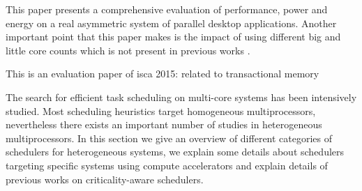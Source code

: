 This paper presents a comprehensive evaluation of performance, power and energy on a real asymmetric system of parallel desktop applications.
Another important point that this paper makes is the impact of using different big and little core counts which is not present in previous works \cite{Cong_quickIA}.









































\iffalse
This is an evaluation paper of isca 2015: \cite{Nakaike:isca} related to transactional memory

The search for efficient task scheduling on multi-core systems has been intensively studied. Most scheduling heuristics target homogeneous multiprocessors, nevertheless there exists an important number of studies in heterogeneous multiprocessors. In this section we give an overview of different categories of schedulers for heterogeneous systems, we explain some details about schedulers targeting specific systems using compute accelerators and explain details of previous works on criticality-aware schedulers.

